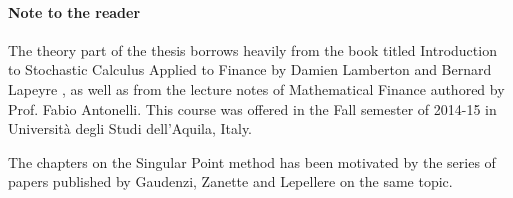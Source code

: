 \paragraph{Note to the reader}
The theory part of the thesis borrows heavily from the book titled Introduction to Stochastic Calculus Applied to Finance by Damien Lamberton and Bernard Lapeyre \cite[]{Lamberton1996}, as well as from the lecture notes of Mathematical Finance authored by Prof. Fabio Antonelli. This course was offered in the Fall semester of 2014-15 in Università degli Studi dell'Aquila, Italy.

The chapters on the Singular Point method has been motivated by the series of papers published by Gaudenzi, Zanette and Lepellere on the same topic.


